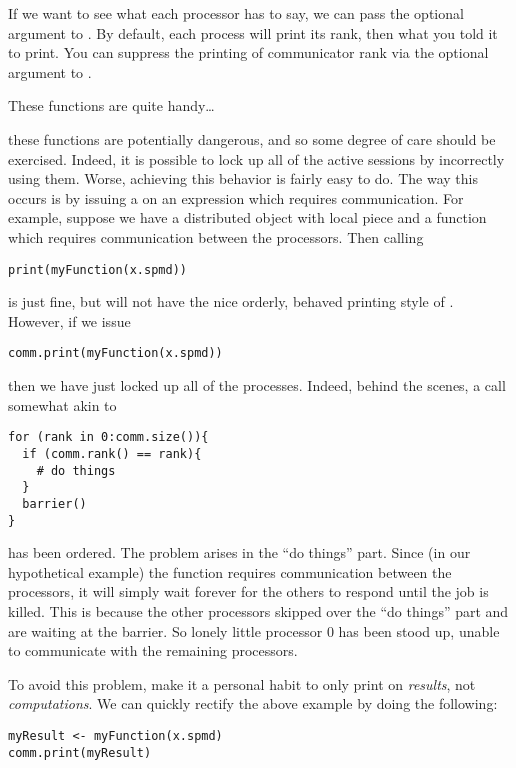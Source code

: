 If we want to see what each processor has to say, we can pass the optional argument  to .  By default, each process will print its rank, then what you told it to print.  You can suppress the printing of communicator rank via the optional argument  to .

These functions are quite handy\dots
\begin{center}
\colorbox{yellow}{\Huge \color{red}{\#\#\#\#\# HOWEVER \#\#\#\#\# }}  
\end{center}
these functions are potentially dangerous, and so some degree of care should be exercised.  Indeed, it is possible to lock up all of the active  sessions by incorrectly using them.  Worse, achieving this behavior is fairly easy to do.  The way this occurs is by issuing a  on an expression which requires communication.  For example, suppose we have a distributed object with local piece  and a function  which requires communication between the processors.  Then calling
\begin{lstlisting}[language=rr,title=A Cautionary Tale of Printing in Parallel (1 of 3)]
print(myFunction(x.spmd)) 
\end{lstlisting}
is just fine, but will not have the nice orderly, behaved printing style of .  However, if we issue
\begin{lstlisting}[language=rr,title=A Cautionary Tale of Printing in Parallel (2 of 3)]
comm.print(myFunction(x.spmd)) 
\end{lstlisting}
then we have just locked up all of the  processes.  Indeed, behind the scenes, a call somewhat akin to 
\begin{lstlisting}[language=rr]
for (rank in 0:comm.size()){
  if (comm.rank() == rank){
    # do things
  }
  barrier()
}
\end{lstlisting}
has been ordered.  The problem arises in the ``do things'' part.  Since (in our hypothetical example) the function  requires communication between the processors, it will simply wait forever for the others to respond until the job is killed.  This is because the other processors skipped over the ``do things'' part and are waiting at the barrier.  So lonely little processor 0 has been stood up, unable to communicate with the remaining processors.

To avoid this problem, make it a personal habit to only print on \emph{results}, not \emph{computations}.  We can quickly rectify the above example by doing the following:
\begin{lstlisting}[language=rr,title=A Cautionary Tale of Printing in Parallel (3 of 3)]
myResult <- myFunction(x.spmd)
comm.print(myResult)
\end{lstlisting}

